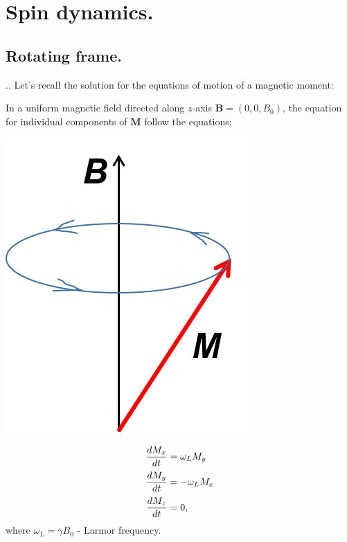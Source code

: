\documentclass[handout]{beamer}
\begin{document}
\section{Spin dynamics.}
\subsection{Rotating frame.}

\begin{frame}[shrink=5]{\thesection.\thesubsection. \insertsubsection}
	Let's recall the solution for the equations of motion of a magnetic moment:
	
		    In a uniform magnetic field directed along $z$-axis $\bm{B} = (0, 0, B_0)$, the equation for individual components of $\bm{M}$ follow the equations:
		    
		    \begin{minipage}[b][4cm]{0.4\textwidth}
		    	\centering
		    	\includegraphics[width=0.7\textwidth]{precession.png}
		    \end{minipage}
		    \hspace{0.1cm}		    
		    \begin{minipage}[b][4cm]{0.4\textwidth}
		    	\centering
		    	\begin{equation} \label{precession}
		    	\setlength{\jot}{5pt}
		    	\begin{aligned}
		    	\dfrac{dM_x}{dt} & =  \omega_L M_y \\
		    	\dfrac{dM_y}{dt} & =  -\omega_L M_x \\
		    	\dfrac{dM_z}{dt} & =  0,
		    	\end{aligned}
		    	\end{equation}
		    	where $\omega_L = \gamma B_0$ - \alert{Larmor frequency}.
		    \end{minipage}
		    

\end{frame}
\end{document}

